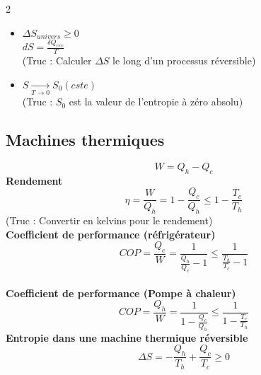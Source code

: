 \documentclass[11pt]{article}
\begin{document}
\begin{multicols}{2}
\begin{itemize}
\begin{itemize}
          \item Isochore : $\delta W = 0 \Rightarrow dE = \delta Q$
        \end{itemize}
        (Truc : Préciser le signe du travail)
  \item $\boxed{\Delta S_{univers} \geq 0}$\\
        $dS = \frac{\delta Q_{rev}}{T}$\\
        (Truc : Calculer $\Delta S$ le long d'un processus réversible)
  \item $\boxed{S \xrightarrow[T\rightarrow 0]{} S_0 (cste)}$\\
        (Truc : $S_0$ est la valeur de l'entropie à zéro absolu)
\end{itemize}

\subsection{Machines thermiques}
\begin{equation*}
  \boxed{W = Q_h - Q_c}
\end{equation*}
\textbf{Rendement}
\begin{equation*}
  \boxed{\eta = \frac{W}{Q_h} = 1 - \frac{Q_c}{Q_h} \leq 1 - \frac{T_c}{T_h}}
\end{equation*}
(Truc : Convertir en kelvins pour le rendement)\\
\textbf{Coefficient de performance (réfrigérateur)}
\begin{equation*}
  \boxed{COP = \frac{Q_c}{W} = \frac{1}{\frac{Q_h}{Q_c} - 1} \leq \frac{1}{\frac{T_h}{T_c} - 1}}
\end{equation*}\\
\textbf{Coefficient de performance (Pompe à chaleur)}
\begin{equation*}
  \boxed{COP = \frac{Q_h}{W} = \frac{1}{1 - \frac{Q_c}{Q_h}} \leq \frac{1}{1 - \frac{T_c}{T_h}}}
\end{equation*}
\textbf{Entropie dans une machine thermique réversible}
\begin{equation*}
  \boxed{\Delta S = -\frac{Q_h}{T_h} + \frac{Q_c}{T_c} \geq 0}
\end{equation*}


\end{multicols}
\end{document}
